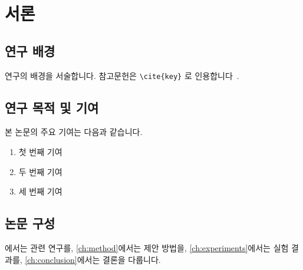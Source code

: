 \chapter{서론}\label{ch:intro}

\section{연구 배경}\label{sec:background}
연구의 배경을 서술합니다. 참고문헌은 \verb|\cite{key}| 로 인용합니다~\cite{knuth1984texbook}.

\section{연구 목적 및 기여}
본 논문의 주요 기여는 다음과 같습니다.
\begin{enumerate}
  \item 첫 번째 기여
  \item 두 번째 기여
  \item 세 번째 기여
\end{enumerate}


\section{논문 구성}
에서는 관련 연구를, \cref{ch:method}에서는 제안 방법을,
\cref{ch:experiments}에서는 실험 결과를, \cref{ch:conclusion}에서는 결론을 다룹니다.
